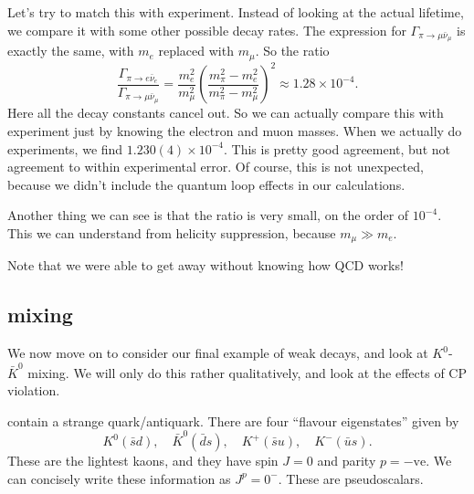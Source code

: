 \documentclass[a4paper]{article}
\begin{document}
Let's try to match this with experiment. Instead of looking at the actual lifetime, we compare it with some other possible decay rates. The expression for $\Gamma_{\pi \to \mu \bar{\nu}_\mu}$ is exactly the same, with $m_e$ replaced with $m_\mu$. So the ratio
\[
  \frac{\Gamma_{\pi \to e\bar{\nu}_e}}{\Gamma_{\pi \to \mu \bar{\nu}_\mu}} = \frac{m_e^2}{m_\mu^2} \left(\frac{m_\pi^2 - m_e^2}{m_\pi^2 - m_\mu^2}\right)^2 \approx 1.28 \times 10^{-4}.
\]
Here all the decay constants cancel out. So we can actually compare this with experiment just by knowing the electron and muon masses. When we actually do experiments, we find $1.230(4) \times 10^{-4}$. This is pretty good agreement, but not agreement to within experimental error. Of course, this is not unexpected, because we didn't include the quantum loop effects in our calculations.

Another thing we can see is that the ratio is very small, on the order of $10^{-4}$. This we can understand from helicity suppression, because $m_\mu \gg m_e$.

Note that we were able to get away without knowing how QCD works!

\subsection{ mixing}
We now move on to consider our final example of weak decays, and look at $K^0$-$\bar{K}^0$ mixing. We will only do this rather qualitatively, and look at the effects of CP violation.

 contain a strange quark/antiquark. There are four ``flavour eigenstates'' given by
\[
  K^0 (\bar{s} d),\quad \bar{K}^0 (\bar{d} s),\quad K^+(\bar{s} u),\quad K^-(\bar{u} s).
\]
These are the lightest kaons, and they have spin $J = 0$ and parity $p = -\mathrm{ve}$. We can concisely write these information as $J^p = 0^-$. These are pseudoscalars.
\end{document}

